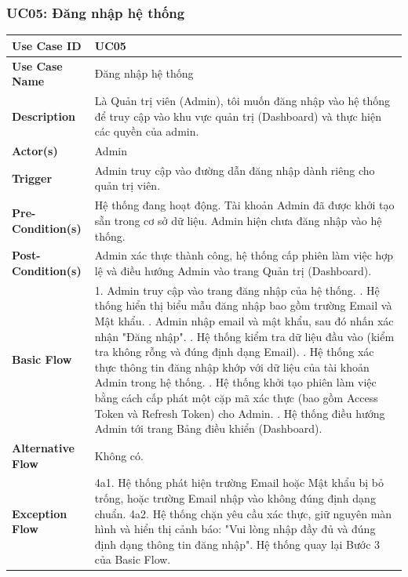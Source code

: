 \documentclass[a4paper,12pt]{article}
\begin{document}
\subsubsection{UC05: Đăng nhập hệ thống}
\begin{longtable}{|p{4cm}|p{11.5cm}|}
\hline
\textbf{Use Case ID} & UC05 \\ \hline
\textbf{Use Case Name} & Đăng nhập hệ thống \\ \hline
\textbf{Description} & Là Quản trị viên (Admin), tôi muốn đăng nhập vào hệ thống để truy cập vào khu vực quản trị (Dashboard) và thực hiện các quyền của admin. \\ \hline
\textbf{Actor(s)} & Admin \\ \hline
\textbf{Trigger} & Admin truy cập vào đường dẫn đăng nhập dành riêng cho quản trị viên. \\ \hline
\textbf{Pre-Condition(s)} & Hệ thống đang hoạt động. Tài khoản Admin đã được khởi tạo sẵn trong cơ sở dữ liệu. Admin hiện chưa đăng nhập vào hệ thống. \\ \hline
\textbf{Post-Condition(s)} & Admin xác thực thành công, hệ thống cấp phiên làm việc hợp lệ và điều hướng Admin vào trang Quản trị (Dashboard). \\ \hline
\textbf{Basic Flow} & 
1. Admin truy cập vào trang đăng nhập của hệ thống. \newline
2. Hệ thống hiển thị biểu mẫu đăng nhập bao gồm trường Email và Mật khẩu. \newline
3. Admin nhập email và mật khẩu, sau đó nhấn xác nhận "Đăng nhập". \newline
4. Hệ thống kiểm tra dữ liệu đầu vào (kiểm tra không rỗng và đúng định dạng Email). \newline
5. Hệ thống xác thực thông tin đăng nhập khớp với dữ liệu của tài khoản Admin trong hệ thống. \newline
6. Hệ thống khởi tạo phiên làm việc bằng cách cấp phát một cặp mã xác thực (bao gồm Access Token và Refresh Token) cho Admin. \newline
7. Hệ thống điều hướng Admin tới trang Bảng điều khiển (Dashboard). \\ \hline
\textbf{Alternative Flow} & 
Không có. \\ \hline
\textbf{Exception Flow} & 
4a1. Hệ thống phát hiện trường Email hoặc Mật khẩu bị bỏ trống, hoặc trường Email nhập vào không đúng định dạng chuẩn. \newline
4a2. Hệ thống chặn yêu cầu xác thực, giữ nguyên màn hình và hiển thị cảnh báo: "Vui lòng nhập đầy đủ và đúng định dạng thông tin đăng nhập". \newline
Hệ thống quay lại Bước 3 của Basic Flow. \newline


\end{longtable}
\end{document}
